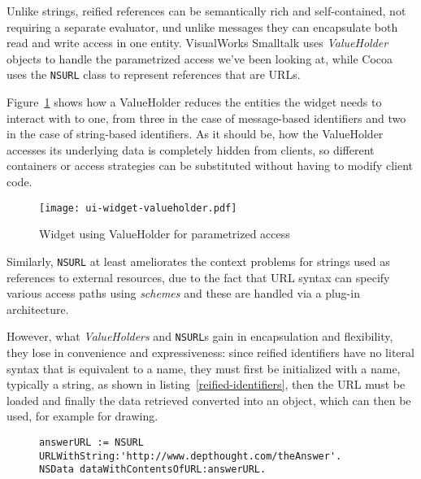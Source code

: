 \documentclass[preprint,authoryear]{llncs}
\begin{document}
Unlike strings, reified references can be semantically rich and self-contained, not requiring
a separate evaluator, und unlike
messages they can encapsulate both read and write access in one entity.  VisualWorks 
Smalltalk uses \emph{ValueHolder} objects to handle the parametrized access we've been
looking at, while Cocoa uses the {\tt NSURL} class to represent references that are URLs.

Figure~\ref{ui-widget-valueholder} shows how a ValueHolder reduces the entities the widget
needs to interact with to one, from three in the case of message-based identifiers and two
in the case of string-based identifiers.  As it should be, how the ValueHolder accesses 
its underlying data is completely hidden from clients, so different containers or access
strategies can be substituted without having to modify client code.

\begin{figure}[htbp]
\begin{center}
\texttt{[image: ui-widget-valueholder.pdf]}
\caption{Widget using ValueHolder for parametrized access}
\label{ui-widget-valueholder}
\end{center}
\end{figure}

Similarly, {\tt NSURL} at least ameliorates the context problems for strings used as
references to external resources, due to the fact that URL syntax can specify 
various access paths using \emph{schemes} and these are handled via a plug-in 
architecture. 

However, what \emph{ValueHolders} and {\tt NSURL}s gain in encapsulation and flexibility,
they lose in convenience and expressiveness:   since reified identifiers have no literal
syntax that is equivalent to a name, they must first be initialized with a name, typically
a string, as shown in listing~\ref{reified-identifiers}, then the URL must be loaded and
finally the data retrieved converted into an object, which can then be used, for example
for drawing. 


\begin{figure}[htbp]
\begin{lstlisting}[style=numbers,label=reified-identifiers,caption=Retrieving image data stored on flickr.com.]
answerURL := NSURL URLWithString:'http://www.depthought.com/theAnswer'.
NSData dataWithContentsOfURL:answerURL.
\end{lstlisting}
\end{figure}
\end{document}
